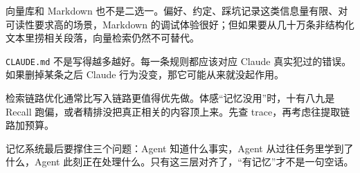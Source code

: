 \documentclass[9pt,a4paper,twocolumn]{ctexart}
\begin{document}
向量库和 Markdown 也不是二选一。偏好、约定、踩坑记录这类信息量有限、对可读性要求高的场景，Markdown 的调试体验很好；但如果要从几十万条非结构化文本里捞相关段落，向量检索仍然不可替代。



\texttt{CLAUDE.md} 不是写得越多越好。每一条规则都应该对应 Claude 真实犯过的错误。如果删掉某条之后 Claude 行为没变，那它可能从来就没起作用。



检索链路优化通常比写入链路更值得优先做。体感“记忆没用”时，十有八九是 Recall 跑偏，或者精排没把真正相关的内容顶上来。先查 trace，再考虑往提取链路加预算。



记忆系统最后要撑住三个问题：Agent 知道什么事实，Agent 从过往任务里学到了什么，Agent 此刻正在处理什么。只有这三层对齐了，“有记忆”才不是一句空话。
\end{document}
